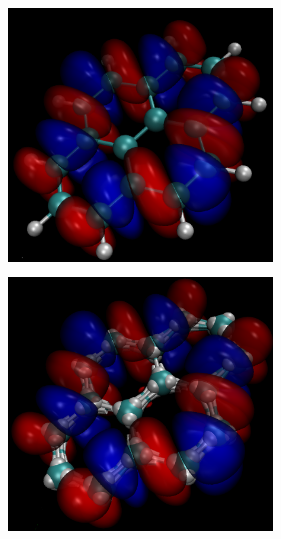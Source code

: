 \documentclass[12pt]{article}
\begin{document}
\begin{figure}
\begin{center}
\includegraphics[width=7cm, height=7cm]{pyrene_520nm.png}
\includegraphics[width=7cm, height=7cm]{ps_pyrene_520nm.png}


\end{center}
\end{figure}
\end{document}
